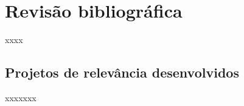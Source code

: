 \setcounter{equation}{0}
\chapter{Revisão bibliográfica}
xxxx
\section{Projetos de relevância desenvolvidos}
xxxxxxx
